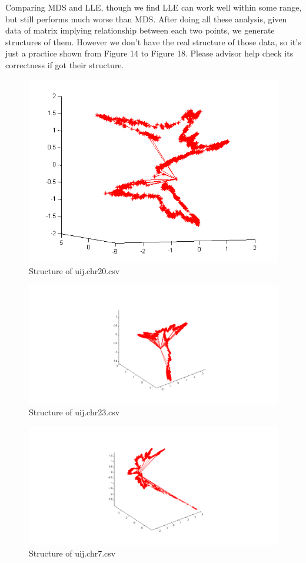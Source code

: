 \documentclass[12pt]{article} %
\begin{document}
Comparing MDS and LLE, though we find LLE can work well within some range, but still performs much worse than MDS. After doing all these analysis, given data of matrix implying relationship between each two points, we generate structures of them. However we don't have the real structure of those data, so it's just a practice shown from Figure 14 to Figure 18. Please advisor help check its correctness if got their structure.

\begin{figure}[ht]\centering
	\includegraphics[scale=0.5]{fig001}
	\caption{Structure of uij.chr20.csv}
\end{figure}

\begin{figure}[ht]\centering
	\includegraphics[scale=0.5]{fig002}
	\caption{Structure of uij.chr23.csv}
\end{figure}

\begin{figure}[ht]\centering
	\includegraphics[scale=0.5]{fig003}
	\caption{Structure of uij.chr7.csv}
\end{figure}
\end{document}
